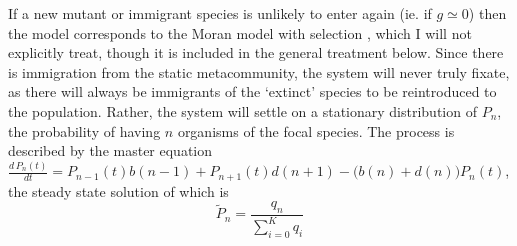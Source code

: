 
If a new mutant or immigrant species is unlikely to enter again (ie. if $g\simeq 0$) then the model corresponds to the Moran model with selection \cite{Taylor2004,Claussen2005,Lambert2006,Blythe2007,Parsons2007,Pigolotti2013,Chalub2016,Czuppon2017}, which I will not explicitly treat, though it is included in the general treatment below. %
Since there is immigration from the static metacommunity, the system will never truly fixate, as there will always be immigrants of the `extinct' species to be reintroduced to the population.  
Rather, the system will settle on a stationary distribution of $P_n$, the probability of having $n$ organisms of the focal species. 
The process is described by the master equation $\frac{d\,P_n(t)}{dt} = P_{n-1}(t)b(n-1) + P_{n+1}(t)d(n+1) - \big(b(n)+d(n)\big)P_n(t)$, the steady state solution of which is \cite{Nisbet1982}
\begin{equation}
\widetilde{P}_n = \frac{q_n}{\sum_{i=0}^K q_i}
 \label{steadystateprobdistr}
\end{equation}
